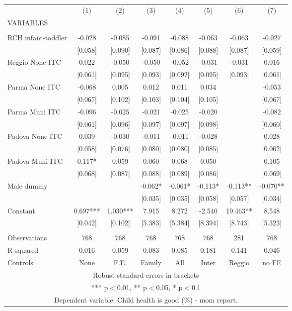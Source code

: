 \begin{tabular}{lccccccc} \hline
 & (1) & (2) & (3) & (4) & (5) & (6) & (7) \\
VARIABLES &  &  &  &  &  &  &  \\ \hline
 &  &  &  &  &  &  &  \\
RCH infant-toddler & -0.028 & -0.085 & -0.091 & -0.088 & -0.063 & -0.063 & -0.027 \\
 & [0.058] & [0.090] & [0.087] & [0.086] & [0.088] & [0.087] & [0.059] \\
Reggio None ITC & 0.022 & -0.050 & -0.050 & -0.052 & -0.031 & -0.031 & 0.016 \\
 & [0.061] & [0.095] & [0.093] & [0.092] & [0.095] & [0.093] & [0.061] \\
Parma None ITC & -0.068 & 0.005 & 0.012 & 0.011 & 0.034 &  & -0.053 \\
 & [0.067] & [0.102] & [0.103] & [0.104] & [0.105] &  & [0.067] \\
Parma Muni ITC & -0.096 & -0.025 & -0.021 & -0.025 & -0.020 &  & -0.082 \\
 & [0.061] & [0.096] & [0.097] & [0.097] & [0.098] &  & [0.060] \\
Padova None ITC & 0.039 & -0.030 & -0.011 & -0.011 & -0.028 &  & 0.028 \\
 & [0.058] & [0.076] & [0.080] & [0.080] & [0.085] &  & [0.062] \\
Padova Muni ITC & 0.117* & 0.059 & 0.060 & 0.068 & 0.050 &  & 0.105 \\
 & [0.068] & [0.087] & [0.088] & [0.089] & [0.086] &  & [0.069] \\
Male dummy &  &  & -0.062* & -0.061* & -0.113* & -0.113** & -0.070** \\
 &  &  & [0.035] & [0.035] & [0.058] & [0.057] & [0.034] \\
Constant & 0.697*** & 1.030*** & 7.915 & 8.272 & -2.540 & 19.463** & 8.548 \\
 & [0.042] & [0.102] & [5.383] & [5.384] & [8.394] & [8.743] & [5.323] \\
 &  &  &  &  &  &  &  \\
Observations & 768 & 768 & 768 & 768 & 768 & 281 & 768 \\
R-squared & 0.016 & 0.059 & 0.083 & 0.085 & 0.181 & 0.141 & 0.046 \\
 Controls & None & F.E. & Family & All & Inter & Reggio & no FE \\ \hline
\multicolumn{8}{c}{ Robust standard errors in brackets} \\
\multicolumn{8}{c}{ *** p$<$0.01, ** p$<$0.05, * p$<$0.1} \\
\multicolumn{8}{c}{ Dependent variable: Child health is good (\%) - mom report.} \\
\end{tabular}
